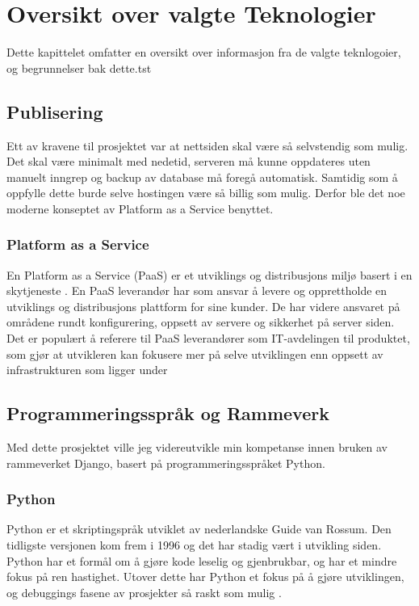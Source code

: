 \chapter{Oversikt over valgte Teknologier}
Dette kapittelet omfatter en oversikt over informasjon fra de valgte teknlogoier, og begrunnelser bak dette.tst
\section{Publisering}
Ett av kravene til prosjektet var at nettsiden skal være så selvstendig som mulig. Det skal være minimalt med nedetid, serveren må kunne oppdateres uten manuelt inngrep og backup av database må foregå automatisk. Samtidig som å oppfylle dette burde selve hostingen være så billig som mulig. Derfor ble det noe moderne konseptet av Platform as a Service benyttet.

\subsection{Platform as a Service}
En Platform as a Service (PaaS) er et utviklings og distribusjons miljø basert i en skytjeneste \cite{ paas:azure}. En PaaS leverandør har som ansvar å levere og opprettholde en utviklings og distribusjons plattform for sine kunder. De har videre ansvaret på områdene rundt konfigurering, oppsett av servere og sikkerhet på server siden. Det er populært å referere til  PaaS leverandører som IT-avdelingen til produktet, som gjør at utvikleren kan fokusere mer på selve utviklingen enn oppsett av infrastrukturen som ligger under \cite[s. 10]{bachelor}


\newpage
\section{Programmeringsspråk og Rammeverk}
Med dette prosjektet ville jeg videreutvikle min kompetanse innen bruken av rammeverket Django, basert på programmeringsspråket Python. 
\subsection{Python}
Python er et skriptingspråk utviklet av nederlandske Guide van Rossum. Den tidligste versjonen kom frem i 1996 og det har stadig vært i utvikling siden. Python har et formål om å gjøre kode leselig og gjenbrukbar, og har et mindre fokus på ren hastighet. Utover dette har Python et fokus på å gjøre utviklingen, og debuggings fasene av prosjekter så raskt som mulig \cite[s. 11]{bachelor}.
